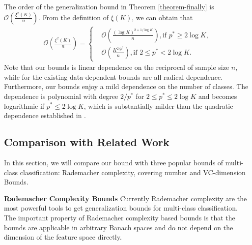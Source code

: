 \documentclass{article}
\begin{document}
The order of the  generalization bound in Theorem \ref{theorem-finally} is
$
 \mathcal{O}\left(\frac{\xi^2(K)}{n}\right).
$
From the definition of $\xi(K)$, we can obtain that
 \begin{align*}
  \mathcal{O}\left(\frac{\xi^2(K)}{n}\right)=
  \left\{
      \begin{aligned}
      &\mathcal{O}\left(\frac{(\log K)^{2+{1}/{\log K}}}{n}\right), \text{if } p^\ast\geq 2\log K,\\
      &\mathcal{O}\left(\frac{K^{2/p^\ast}}{n}\right), \text{if } 2\leq p^\ast< 2\log K.
      \end{aligned}
      \right.
  \end{align*}
  Note that our bounds is linear dependence on the reciprocal of sample size $n$,
  while for the existing data-dependent bounds are all radical dependence.
Furthermore,
  our bounds enjoy a mild dependence on the number of classes.
  The dependence is polynomial with degree $2/p^\ast$ for $2\leq p^\ast\leq 2\log K$ and
  becomes logarithmic if $p^\ast\leq 2\log K$,
  which is substantially milder than the quadratic dependence
  established in \cite{koltchinskii2002empirical,koltchinskii2001some,mohri2012foundations,cortes2013multi}.


\subsection{Comparison with Related Work}
In this section, we will compare our bound with three popular bounds of multi-class classification:
 Rademacher complexity, covering number and VC-dimension Bounds.

\textbf{Rademacher Complexity Bounds}
Currently Rademacher complexity are the most powerful tools to get generalization bounds for
multi-class classification.
The important property of Rademacher complexity based bounds is that the
bounds are applicable in arbitrary Banach spaces and do not depend on the dimension of the feature
space directly.
\end{document}
